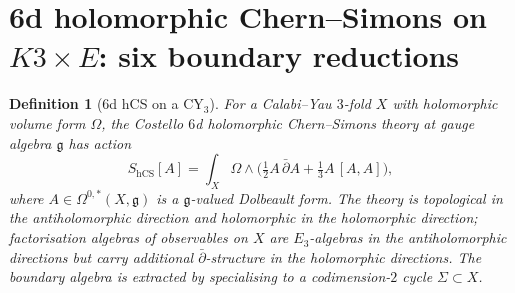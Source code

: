 \documentclass[11pt]{article}
\newtheorem{definition}[theorem]{Definition}
\begin{document}
\section{6d holomorphic Chern--Simons on $K3 \times E$: six boundary
reductions}
\label{sec:6dhCS}

\begin{definition}[6d hCS on a CY$_3$]
\label{def:6dhCS}
For a Calabi--Yau $3$-fold $X$ with holomorphic volume form $\Omega$,
the Costello $6$d holomorphic Chern--Simons theory at gauge algebra
$\mathfrak g$ has action
\[
S_{\mathrm{hCS}}[A]
= \int_{X} \Omega \wedge \bigl(\tfrac{1}{2} A \,\bar\partial A
+ \tfrac{1}{3} A \, [A, A]\bigr),
\]
where $A \in \Omega^{0, \ast}(X, \mathfrak g)$ is a $\mathfrak g$-valued
Dolbeault form. The theory is topological in the antiholomorphic
direction and holomorphic in the holomorphic direction;
factorisation algebras of observables on $X$ are $E_3$-algebras in
the antiholomorphic directions but carry additional
$\bar\partial$-structure in the holomorphic directions. The boundary
algebra is extracted by specialising to a codimension-$2$ cycle
$\Sigma \subset X$.
\end{definition}
\end{document}
